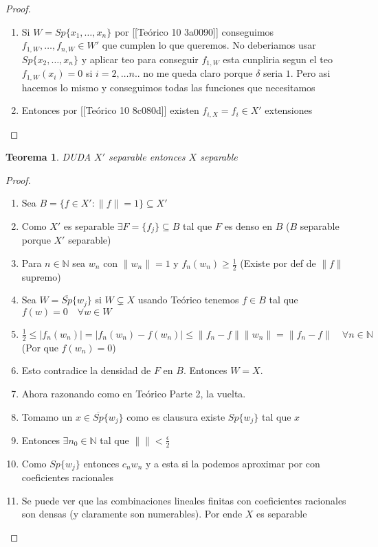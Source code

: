 \documentclass[10pt]{extarticle}
\theoremstyle{break}
\newtheorem{theorem}{Teorema}[section]
\theoremstyle{definition}
\begin{document}
\begin{proof}
	\begin{enumerate}
		\item Si $W=Sp\{ x_{1},\ldots,x_{n} \}$ por [[Teórico 10 3a0090]] conseguimos $f_{1,W},\ldots,f_{n,W}\in W'$ que cumplen lo que queremos. No deberiamos usar $Sp\{ x_{2},\ldots,x_{n} \}$ y aplicar teo para conseguir $f_{1,W}$ esta cunpliria segun el teo $f_{1,W}(x_{i})=0$ si $i=2,\ldots n$.. no me queda claro porque $\delta$ seria $1$. Pero asi hacemos lo mismo y conseguimos todas las funciones que necesitamos
		\item Entonces por [[Teórico 10 8c080d]] existen $f_{i,X} = f_{i}\in X'$ extensiones
	\end{enumerate}
\end{proof}

\begin{theorem} DUDA
$X'$ separable entonces $X$ separable
\end{theorem}

\begin{proof}
	\begin{enumerate}
		\item Sea $B=\{ f\in X':\lVert f \rVert=1 \}\subseteq X'$
		\item Como $X'$ es separable $\exists F=\{ f_{j} \}\subseteq B$ tal que $F$ es denso en $B$ ($B$ separable porque $X'$ separable)
		\item Para $n\in \mathbb{N}$ sea $w_{n}$ con $\lVert w_{n} \rVert=1$ y $f_{n}(w_{n})\geq \frac{1}{2}$ (Existe por def de $\lVert f \rVert$ supremo)
		\item Sea $W=\overline{Sp}\{ w_{j} \}$ si $W\subsetneq X$ usando Teórico tenemos $f\in B$ tal que $f(w)=0\quad\forall w\in W$
		\item $\frac{1}{2}\leq \lvert f_{n}(w_{n}) \rvert=\lvert f_{n}(w_{n})-f(w_{n}) \rvert\leq \lVert f_{n}-f \rVert\lVert w_{n} \rVert=\lVert f_{n}-f \rVert\quad\forall n\in \mathbb{N}$ (Por que $f(w_{n})=0$)
		\item Esto contradice la densidad de $F$ en $B$. Entonces $W=X$.
		\item Ahora razonando como en Teórico Parte 2, la vuelta.
		\item Tomamo un $x\in \overline{Sp}\{ w_{j} \}$ como es clausura existe $Sp\{ w_{j} \}$ tal que $x$
		\item Entonces $\exists n_{0}\in \mathbb{N}$ tal que $\lVert \rVert<\frac{\epsilon}{2}$
		\item Como $Sp\{ w_{j} \}$ entonces $c_{n}w_{n}$ y a esta si la podemos aproximar por con coeficientes racionales
		\item Se puede ver que las combinaciones lineales finitas con coeficientes racionales son densas (y claramente son numerables). 
			Por ende $X$ es separable
	\end{enumerate}
\end{proof}
\end{document}

